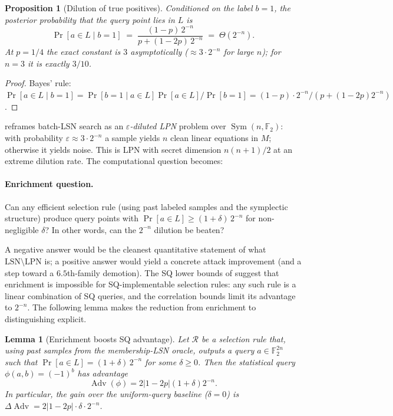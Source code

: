 \documentclass[11pt,a4paper]{article}
\theoremstyle{plain}
\newtheorem{lemma}[theorem]{Lemma}
\newtheorem{proposition}[theorem]{Proposition}
\theoremstyle{definition}
\newcommand{\F}{\mathbb{F}}
\begin{document}
\begin{proposition}[Dilution of true positives]
\label{prop:dilution}
Conditioned on the label $b=1$, the posterior probability that the query point lies in $L$ is
\[
\Pr[a \in L \mid b=1] \;=\; \frac{(1-p)\,2^{-n}}{p + (1-2p)\,2^{-n}} \;=\; \Theta(2^{-n}).
\]
At $p=1/4$ the exact constant is $3$ asymptotically ($\approx 3\cdot 2^{-n}$ for large $n$); for $n=3$ it is exactly $3/10$.
\end{proposition}

\begin{proof}
Bayes' rule: $\Pr[a \in L \mid b=1] = \Pr[b=1 \mid a \in L]\Pr[a \in L] / \Pr[b=1] = (1-p)\cdot 2^{-n} / (p + (1-2p)2^{-n})$.
\end{proof}

 reframes batch-LSN search as an \emph{$\varepsilon$-diluted LPN} problem over $\operatorname{Sym}(n,\F_2)$: with probability $\varepsilon \approx 3\cdot 2^{-n}$ a sample yields $n$ clean linear equations in $M$; otherwise it yields noise.  This is LPN with secret dimension $n(n+1)/2$ at an extreme dilution rate.  The computational question becomes:

\paragraph{Enrichment question.}
\label{q:enrichment}
Can any efficient selection rule (using past labeled samples and the symplectic structure) produce query points with $\Pr[a \in L] \geq (1+\delta)\,2^{-n}$ for non-negligible $\delta$?  In other words, can the $2^{-n}$ dilution be beaten?

A negative answer would be the cleanest quantitative statement of what $\mathrm{LSN}\setminus\mathrm{LPN}$ is; a positive answer would yield a concrete attack improvement (and a step toward a $6.5$th-family demotion).  The SQ lower bounds of  suggest that enrichment is impossible for SQ-implementable selection rules: any such rule is a linear combination of SQ queries, and the correlation bounds limit its advantage to $2^{-n}$. The following lemma makes the reduction from enrichment to distinguishing explicit.

\begin{lemma}[Enrichment boosts SQ advantage]
\label{lem:enrichment-sq}
Let $\mathcal{R}$ be a selection rule that, using past samples from the membership-LSN oracle, outputs a query $a \in \F_2^{2n}$ such that $\Pr[a \in L] = (1+\delta)\,2^{-n}$ for some $\delta \ge 0$. Then the statistical query $\phi(a,b) = (-1)^b$ has advantage
\[
  \operatorname{Adv}(\phi) = 2|1-2p|(1+\delta)2^{-n}.
\]
In particular, the gain over the uniform-query baseline ($\delta=0$) is $\Delta\operatorname{Adv} = 2|1-2p|\cdot\delta\cdot 2^{-n}$.
\end{lemma}
\end{document}
